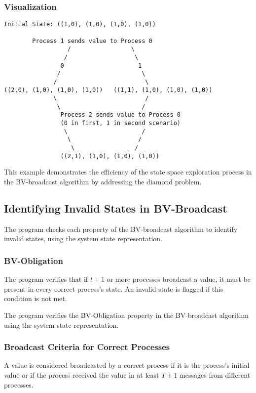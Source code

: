 \documentclass[a4paper,11pt,oneside]{report}
\begin{document}
\subsubsection{Visualization}
\begin{verbatim}
Initial State: ((1,0), (1,0), (1,0), (1,0))

        Process 1 sends value to Process 0
                  /                 \
                 /                   \
                0                     1
               /                       \
              /                         \
((2,0), (1,0), (1,0), (1,0))   ((1,1), (1,0), (1,0), (1,0))
              \                         /
               \                       /
                Process 2 sends value to Process 0
                (0 in first, 1 in second scenario)
                 \                     /
                  \                   /
                   \                 /
                ((2,1), (1,0), (1,0), (1,0))
\end{verbatim}

This example demonstrates the efficiency of the state space exploration process in the BV-broadcast algorithm by addressing the diamond problem.

\subsection{Identifying Invalid States in BV-Broadcast}
The program checks each property of the BV-broadcast algorithm to identify invalid states, using the system state representation.

\subsubsection{BV-Obligation}
The program verifies that if \( t+1 \) or more processes broadcast a value, it must be present in every correct process's state. An invalid state is flagged if this condition is not met.

The program verifies the BV-Obligation property in the BV-broadcast algorithm using the system state representation.

\subsubsection{Broadcast Criteria for Correct Processes}
A value is considered broadcasted by a correct process if it is the process's initial value or if the process received the value in at least \( T + 1 \) messages from different processes.
\end{document}
